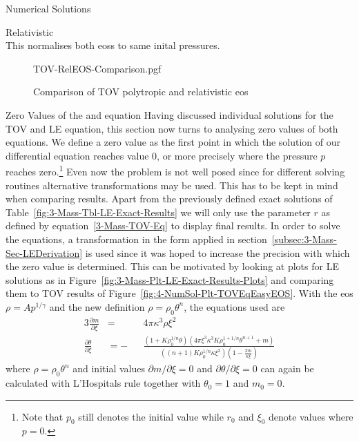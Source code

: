 \begin{section}{Numerical Solutions}
\begin{subsection}{Relativistic \texorpdfstring{}{EoS}}
\begin{equation}
\end{equation}
This normalises both \acp{eos} to same inital pressures.
\begin{figure}
	\centering
	{TOV-RelEOS-Comparison.pgf}
	\caption[Comparison of TOV polytropic and relativistic EOS]{Comparison of TOV polytropic and relativistic \acs{eos}}
	\label{fig:4-NumSol-Plt-RelEOS-TOV-Comparison}
\end{figure}
\end{subsection}
%
%
\begin{subsection}{Zero Values of the \texorpdfstring{}{TOV} and \texorpdfstring{}{LE} equation}
\label{subsec:4-NumSol-Sec-TOV-Exponents}
Having discussed individual solutions for the \ac{TOV} and \ac{LE} equation, this section now turns to analysing zero values of both equations.
We define a zero value as the first point in which the solution of our differential equation reaches value $0$, or more precisely where the pressure $p$ reaches zero.\footnote{Note that $p_0$ still denotes the initial value while $r_0$ and $\xi_0$ denote values where $p=0$.}
Even now the problem is not well posed since for different solving routines alternative transformations may be used.
This has to be kept in mind when comparing results. 
Apart from the previously defined exact solutions of Table~\ref{fig:3-Mass-Tbl-LE-Exact-Results} we will only use the parameter $r$ as defined by equation~\eqref{3-Mass-TOV-Eq} to display final results.
In order to solve the equations, a transformation in the form applied in section~\ref{subsec:3-Mass-Sec-LEDerivation} is used since it was hoped to increase the precision with which the zero value is determined.
This can be motivated by looking at plots for \ac{LE} solutions as in Figure~\ref{fig:3-Mass-Plt-LE-Exact-Results-Plots} and comparing them to \ac{TOV} results of Figure~\ref{fig:4-NumSol-Plt-TOVEqEasyEOS}.
With the \ac{eos} $\rho=Ap^{1/\gamma}$ and the new definition $\rho=\rho_0\theta^n$, the equations used are 
\begin{alignat}{3}
	\frac{\partial m}{\partial\xi} &= &&4\pi\kappa^3\rho\xi^2\\
	\frac{\partial\theta}{\partial\xi} &= -&&\frac{\left(1+K\rho_0^{1/n}\theta\right)\left(4\pi\xi^3\kappa^3 K\rho_0^{1+1/n}\theta^{n+1}+ m\right)}{\left((n+1)K\rho_0^{1/n}\kappa\xi^2\right)\left(1-\frac{2 m}{\kappa\xi}\right)}
	\label{eq:4-NumSol-Equ-TOV-Exponents-Transf-TOV}
\end{alignat}
where $\rho=\rho_0\theta^n$ and initial values $\partial m/\partial\xi=0$ and $\partial\theta/\partial\xi=0$ can again be calculated with L'Hospitals rule together with $\theta_0=1$ and $ m_0=0$.

\end{subsection}
\end{section}
